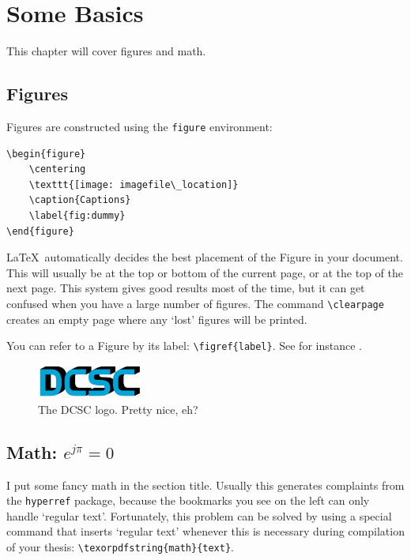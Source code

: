 %
\chapter{Some Basics}

This chapter will cover figures and math. 

\section{Figures}

Figures are constructed using the \texttt{figure} environment:
\begin{verbatim}
\begin{figure}
	\centering
	\texttt{[image: imagefile\_location]}
	\caption{Captions}
	\label{fig:dummy}
\end{figure}
\end{verbatim}

\LaTeX\ automatically decides the best placement of the Figure in your document. This will usually be at the top or bottom of the current page, or at the top of the next page. This system gives good results most of the time, but it can get confused when you have a large number of figures. The command \verb"\clearpage" creates an empty page where any `lost' figures will be printed.

You can refer to a Figure by its label: \verb"\figref{label}". See for instance .

\begin{figure}
	\centering
	\includegraphics[width=0.31415\textwidth]{STYLESTUFF/DCSC}
	\caption{The \acs{DCSC} logo. Pretty nice, eh?}
	\label{fig:dummy}
\end{figure}

\section{Math: \texorpdfstring{$e^{j \pi}=0$}{``Euler's identity''}}

I put some fancy math in the section title. Usually this generates complaints from the \texttt{hyperref} package, because the bookmarks you see on the left can only handle `regular text'. Fortunately, this problem can be solved by using a special command that inserts `regular text' whenever this is necessary during compilation of your thesis: \verb"\texorpdfstring{math}{text}".


